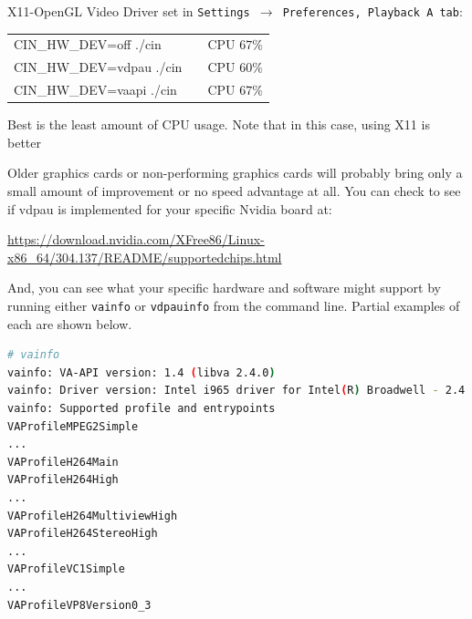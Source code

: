 \noindent X11-OpenGL Video Driver set in \texttt{Settings $\rightarrow$ Preferences, Playback A tab}:

\begin{center}
	\begin{tabular}{lcr}
		CIN\_HW\_DEV=off ./cin & &CPU $67\%$ \\
		CIN\_HW\_DEV=vdpau ./cin & &CPU $60\%$ \\
		CIN\_HW\_DEV=vaapi ./cin & &CPU $67\%$ \\
	\end{tabular}
\end{center}

\noindent Best is the least amount of CPU usage. Note that in this case, using X11 is better

Older graphics cards or non-performing graphics cards will probably bring only a small amount of improvement or no speed advantage at all.  You can check to see if vdpau is implemented for your specific Nvidia board at:

\url{https://download.nvidia.com/XFree86/Linux-x86_64/304.137/README/supportedchips.html}

And, you can see what your specific hardware and software might support by running either \texttt{vainfo} or \texttt{vdpauinfo} from the command line.  Partial examples of each are shown below.

\begin{lstlisting}[language=bash,numbers=none]
# vainfo
vainfo: VA-API version: 1.4 (libva 2.4.0)
vainfo: Driver version: Intel i965 driver for Intel(R) Broadwell - 2.4.0.pre1 (2.3.0-11-g881e67a)
vainfo: Supported profile and entrypoints
VAProfileMPEG2Simple            		
...
VAProfileH264Main              
VAProfileH264High  
...
VAProfileH264MultiviewHigh 
VAProfileH264StereoHigh 
...
VAProfileVC1Simple 
...
VAProfileVP8Version0_3 
\end{lstlisting}


